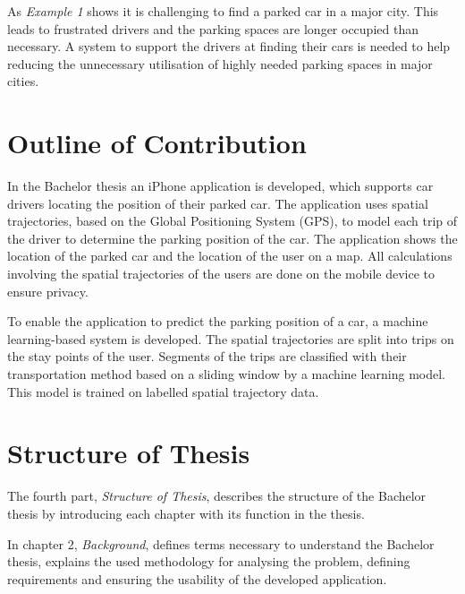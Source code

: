 As \textit{Example 1} shows it is challenging to find a parked car in a major city. This leads to frustrated drivers and the parking spaces are longer occupied than necessary. A system to support the drivers at finding their cars is needed to help reducing the unnecessary utilisation of highly needed parking spaces in major cities.

\section{Outline of Contribution}

In the Bachelor thesis an iPhone application is developed, which supports car drivers locating the position of their parked car. The application uses spatial trajectories, based on the Global Positioning System (GPS), to model each trip of the driver to determine the parking position of the car. The application shows the location of the parked car and the location of the user on a map. All calculations involving the spatial trajectories of the users are done on the mobile device to ensure privacy.

To enable the application to predict the parking position of a car, a machine learning-based system is developed. The spatial trajectories are split into trips on the stay points of the user. Segments of the trips are classified with their transportation method based on a sliding window by a machine learning model. This model is trained on labelled spatial trajectory data. \cite{zheng2010geolife}

\section{Structure of Thesis}
The fourth part, \textit{Structure of Thesis}, describes the structure of the Bachelor thesis by introducing each chapter with its function in the thesis.

In chapter 2, \textit{Background}, defines terms necessary to understand the Bachelor thesis, explains the used methodology for analysing the problem, defining requirements and ensuring the usability of the developed application.
